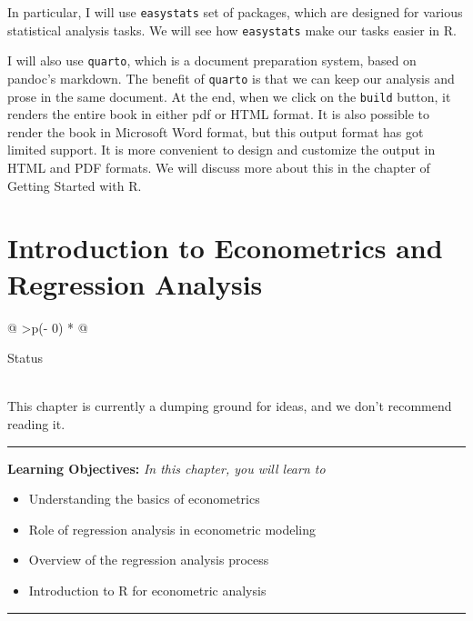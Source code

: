 \documentclass[
  letterpaper,
  twoside,
  openright,
  headsepline,
  footsepline,
  listof = totocnumbered,
  chapterprefix = true,
  titlepage = false]{scrbook}
\providecommand{\abstractname}{Learning Objectives} %
\newenvironment{objectives}[1]{%
	\hrule
	\vspace{5pt}
	\small\textbf{\abstractname: } 
	\newline
	\vspace{0.1cm}
	\small\emph{#1} %
	\itshape %
}{%
	\vspace{5pt}
	\hrule
	\vspace{0.6cm}
}
\begin{document}
In particular, I will use \texttt{easystats} set of packages, which are
designed for various statistical analysis tasks. We will see how
\texttt{easystats} make our tasks easier in R.

I will also use \texttt{quarto}, which is a document preparation system,
based on pandoc's markdown. The benefit of \texttt{quarto} is that we
can keep our analysis and prose in the same document. At the end, when
we click on the \texttt{build} button, it renders the entire book in
either pdf or HTML format. It is also possible to render the book in
Microsoft Word format, but this output format has got limited support.
It is more convenient to design and customize the output in HTML and PDF
formats. We will discuss more about this in the chapter of Getting
Started with R.


\hypertarget{introduction-to-econometrics-and-regression-analysis}{%
\chapter{Introduction to Econometrics and Regression
Analysis}\label{introduction-to-econometrics-and-regression-analysis}}

\begin{longtable}[]{@{}
  >{\centering\arraybackslash}p{(\columnwidth - 0\tabcolsep) * }@{}}
\toprule\noalign{}
\begin{minipage}[b]{\linewidth}\centering
Status
\end{minipage} \\
\midrule\noalign{}
\endhead
\bottomrule\noalign{}
\endlastfoot
This chapter is currently a dumping ground for ideas, and we don't
recommend reading it. \\
\end{longtable}

\begin{objectives}{In this chapter, you will learn to}
\begin{itemize}

\item{Understanding the basics of econometrics}

\item{Role of regression analysis in econometric modeling}

\item{Overview of the regression analysis process}

\item{Introduction to R for econometric analysis}

\end{itemize}

\end{objectives}
\end{document}
